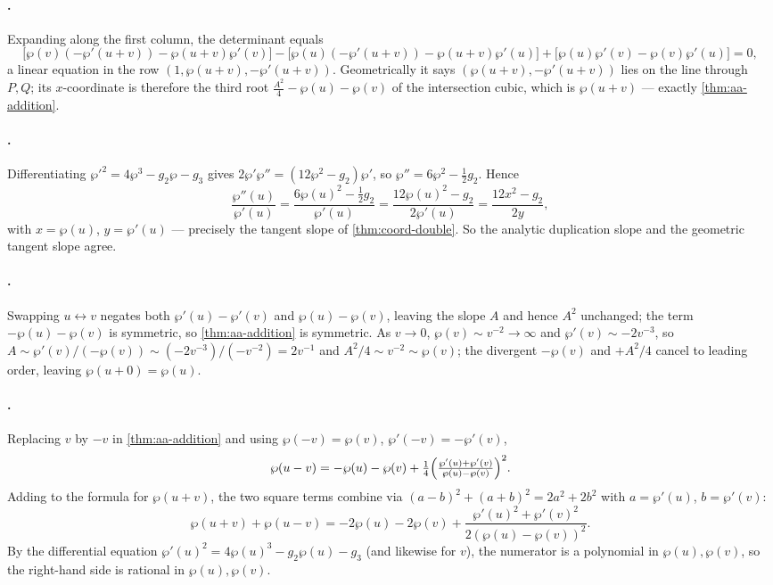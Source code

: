 \paragraph{.}
Expanding along the first column, the determinant equals
\[
  \bigl[\wp(v)(-\wp'(u{+}v)) - \wp(u{+}v)\wp'(v)\bigr]
  - \bigl[\wp(u)(-\wp'(u{+}v)) - \wp(u{+}v)\wp'(u)\bigr]
  + \bigl[\wp(u)\wp'(v) - \wp(v)\wp'(u)\bigr] = 0,
\]
a linear equation in the row \((1, \wp(u+v), -\wp'(u+v))\). Geometrically it says
\((\wp(u+v), -\wp'(u+v))\) lies on the line through \(P, Q\); its \(x\)-coordinate
is therefore the third root \(\tfrac{A^2}{4} - \wp(u) - \wp(v)\) of the
intersection cubic, which is \(\wp(u+v)\) --- exactly \cref{thm:aa-addition}.

\paragraph{.}
Differentiating \(\wp'^2 = 4\wp^3 - g_2\wp - g_3\) gives \(2\wp'\wp'' = (12\wp^2 -
g_2)\wp'\), so \(\wp'' = 6\wp^2 - \tfrac12 g_2\). Hence
\[
  \frac{\wp''(u)}{\wp'(u)} = \frac{6\wp(u)^2 - \tfrac12 g_2}{\wp'(u)}
  = \frac{12\wp(u)^2 - g_2}{2\wp'(u)} = \frac{12x^2 - g_2}{2y},
\]
with \(x = \wp(u)\), \(y = \wp'(u)\) --- precisely the tangent slope of
\cref{thm:coord-double}. So the analytic duplication slope and the geometric
tangent slope agree.

\paragraph{.}
Swapping \(u \leftrightarrow v\) negates both \(\wp'(u) - \wp'(v)\) and
\(\wp(u) - \wp(v)\), leaving the slope \(A\) and hence \(A^2\) unchanged; the term
\(-\wp(u) - \wp(v)\) is symmetric, so \cref{thm:aa-addition} is symmetric. As
\(v \to 0\), \(\wp(v) \sim v^{-2} \to \infty\) and \(\wp'(v) \sim -2v^{-3}\), so
\(A \sim \wp'(v)/(-\wp(v)) \sim (-2v^{-3})/(-v^{-2}) = 2v^{-1}\) and
\(A^2/4 \sim v^{-2} \sim \wp(v)\); the divergent \(-\wp(v)\) and
\(+A^2/4\) cancel to leading order, leaving \(\wp(u+0) = \wp(u)\).

\paragraph{.}
Replacing \(v\) by \(-v\) in \cref{thm:aa-addition} and using \(\wp(-v) = \wp(v)\),
\(\wp'(-v) = -\wp'(v)\),
\[
  \wp(u-v) = -\wp(u) - \wp(v) + \tfrac14\Bigl(\tfrac{\wp'(u) + \wp'(v)}{\wp(u) - \wp(v)}\Bigr)^2 .
\]
Adding to the formula for \(\wp(u+v)\), the two square terms combine via
\((a-b)^2 + (a+b)^2 = 2a^2 + 2b^2\) with \(a = \wp'(u)\), \(b = \wp'(v)\):
\[
  \wp(u+v) + \wp(u-v) = -2\wp(u) - 2\wp(v)
  + \frac{\wp'(u)^2 + \wp'(v)^2}{2(\wp(u) - \wp(v))^2}.
\]
By the differential equation \(\wp'(u)^2 = 4\wp(u)^3 - g_2\wp(u) - g_3\) (and
likewise for \(v\)), the numerator is a polynomial in \(\wp(u), \wp(v)\), so the
right-hand side is rational in \(\wp(u), \wp(v)\).

